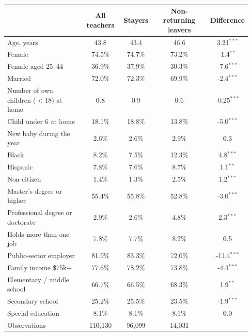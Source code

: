 \begin{tabular}{lcccc}
\toprule
 & All teachers & Stayers & Non-returning leavers & Difference \\
\midrule
Age, years & 43.8 & 43.4 & 46.6 & \cellcolor{sigok}3.21$^{***}$ \\
Female & 74.5\% & 74.7\% & 73.2\% & -1.4$^{**}$ \\
Female aged 25--44 & 36.9\% & 37.9\% & 30.3\% & \cellcolor{sigok}-7.6$^{***}$ \\
Married & 72.0\% & 72.3\% & 69.9\% & \cellcolor{sigok}-2.4$^{***}$ \\
Number of own children ($<$18) at home & 0.8 & 0.9 & 0.6 & \cellcolor{sigok}-0.25$^{***}$ \\
Child under 6 at home & 18.1\% & 18.8\% & 13.8\% & \cellcolor{sigok}-5.0$^{***}$ \\
New baby during the year & 2.6\% & 2.6\% & 2.9\% & 0.3 \\
Black & 8.2\% & 7.5\% & 12.3\% & \cellcolor{sigok}4.8$^{***}$ \\
Hispanic & 7.8\% & 7.6\% & 8.7\% & 1.1$^{**}$ \\
Non-citizen & 1.4\% & 1.3\% & 2.5\% & 1.2$^{***}$ \\
Master's degree or higher & 55.4\% & 55.8\% & 52.8\% & \cellcolor{sigok}-3.0$^{***}$ \\
Professional degree or doctorate & 2.9\% & 2.6\% & 4.8\% & \cellcolor{sigok}2.3$^{***}$ \\
Holds more than one job & 7.8\% & 7.7\% & 8.2\% & 0.5 \\
Public-sector employer & 81.9\% & 83.3\% & 72.0\% & \cellcolor{sigok}-11.4$^{***}$ \\
Family income \$75k+ & 77.6\% & 78.2\% & 73.8\% & \cellcolor{sigok}-4.4$^{***}$ \\
Elementary / middle school & 66.7\% & 66.5\% & 68.3\% & 1.9$^{**}$ \\
Secondary school & 25.2\% & 25.5\% & 23.5\% & -1.9$^{***}$ \\
Special education & 8.1\% & 8.1\% & 8.1\% & 0.0 \\
\midrule
Observations & 110,130 & 96,099 & 14,031 & \\
\bottomrule
\end{tabular}
